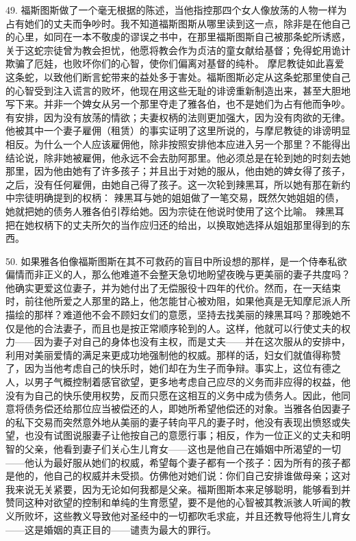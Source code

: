 49. 福斯图斯做了一个毫无根据的陈述，当他指控那四个女人像放荡的人物一样为占有她们的丈夫而争吵时。我不知道福斯图斯从哪里读到这一点，除非是在他自己的心里，如同在一本不敬虔的谬误之书中，在那里福斯图斯自己被那条蛇所诱惑，关于这蛇宗徒曾为教会担忧，他愿将教会作为贞洁的童女献给基督；免得蛇用诡计欺骗了厄娃，也败坏你们的心智，使你们偏离对基督的纯朴。 摩尼教徒如此喜爱这条蛇，以致他们断言蛇带来的益处多于害处。福斯图斯必定从这条蛇那里使自己的心智受到注入谎言的败坏，他现在用这些无耻的诽谤重新制造出来，甚至大胆地写下来。并非一个婢女从另一个那里夺走了雅各伯，也不是她们为占有他而争吵。有安排，因为没有放荡的情欲；夫妻权柄的法则更加强大，因为没有肉欲的无律。他被其中一个妻子雇佣（租赁）的事实证明了这里所说的，与摩尼教徒的诽谤明显相反。为什么一个人应该雇佣他，除非按照安排他本应进入另一个那里？不能得出结论说，除非她被雇佣，他永远不会去肋阿那里。他必须总是在轮到她的时刻去她那里，因为他由她有了许多孩子；并且出于对她的服从，他由她的婢女得了孩子，之后，没有任何雇佣，由她自己得了孩子。这一次轮到辣黑耳，所以她有那在新约中宗徒明确提到的权柄： 辣黑耳与她的姐姐做了一笔交易，既然欠她姐姐的债，她就把她的债务人雅各伯引荐给她。因为宗徒在他说时使用了这个比喻。 辣黑耳把在她权柄下的丈夫所欠的当作应归还的给出，以换取她选择从姐姐那里得到的东西。\par

50. 如果雅各伯像福斯图斯在其不可救药的盲目中所设想的那样，是一个侍奉私欲偏情而非正义的人，那么他难道不会整天急切地盼望夜晚与更美丽的妻子共度吗？他确实更爱这位妻子，并为她付出了无偿服役十四年的代价。然而，在一天结束时，前往他所爱之人那里的路上，他怎能甘心被劝阻，如果他真是无知摩尼派人所描绘的那样？难道他不会不顾妇女们的意愿，坚持去找美丽的辣黑耳吗？那晚她不仅是他的合法妻子，而且也是按正常顺序轮到的人。这样，他就可以行使丈夫的权力——因为妻子对自己的身体也没有主权，而是丈夫——并在这次服从的安排中，利用对美丽爱情的满足来更成功地强制他的权威。那样的话，妇女们就值得称赞了，因为当他考虑自己的快乐时，她们却在为生子而争辩。事实上，这位有德之人，以男子气概控制着感官欲望，更多地考虑自己应尽的义务而非应得的权益，他没有为自己的快乐使用权势，反而只愿在这相互的义务中成为债务人。因此，他同意将债务偿还给那位应当被偿还的人，即她所希望他偿还的对象。当雅各伯因妻子的私下交易而突然意外地从美丽的妻子转向平凡的妻子时，他没有表现出愤怒或失望，也没有试图说服妻子让他按自己的意愿行事；相反，作为一位正义的丈夫和明智的父亲，他看到妻子们关心生儿育女——这也是他自己在婚姻中所渴望的一切——他认为最好服从她们的权威，希望每个妻子都有一个孩子：因为所有的孩子都是他的，他自己的权威并未受损。仿佛他对她们说：你们自己安排谁做母亲；这对我来说无关紧要，因为无论如何我都是父亲。福斯图斯本来足够聪明，能够看到并赞同这种对欲望的控制和单纯的生育愿望，要不是他的心智被其教派骇人听闻的教义所败坏，这些教义导致他对圣经中的一切都吹毛求疵，并且还教导他将生儿育女——这是婚姻的真正目的——谴责为最大的罪行。\par

